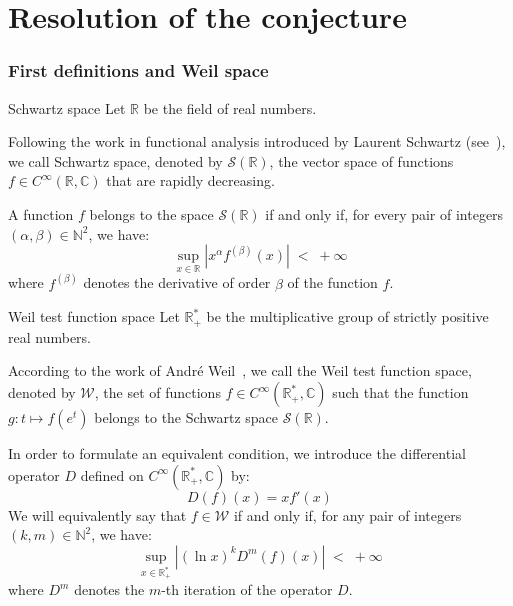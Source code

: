 \documentclass[Riemann_Hypothesis.tex]{subfiles}
\begin{document}
\pagebreak
\color{red}
\part{Resolution of the conjecture}
\color{black}

\color{red}
\section{First definitions and Weil space}
\color{black}

\begin{DefNefEn}[label=df:EspaceSchwartz]{Schwartz space}
    Let $\mathbb{R}$ be the field of real numbers. \par
    Following the work in functional analysis introduced by Laurent Schwartz 
    (see~\cite{schwartz1966_distributions_en}), we call Schwartz space, denoted by $\mathcal{S}(\mathbb{R})$, the vector space of functions $f \in C^\infty(\mathbb{R}, \mathbb{C})$ that are rapidly decreasing. \par
    A function $f$ belongs to the space $\mathcal{S}(\mathbb{R})$ if and only if, for every pair of integers $(\alpha, \beta) \in \mathbb{N}^2$, we have:
    \begin{equation*}
        \sup_{x \in \mathbb{R}} \left| x^\alpha f^{(\beta)}(x) \right| \;<\; +\infty
    \end{equation*}
    where $f^{(\beta)}$ denotes the derivative of order $\beta$ of the function $f$.
\end{DefNefEn}


\begin{DefNefEn}[label=df:EspaceWeil_fr]{Weil test function space}
    Let $\mathbb{R}_+^*$ be the multiplicative group of strictly positive real numbers. \par
    According to the work of André Weil~\cite{weil1952_formules_en}, 
    we call the Weil test function space, denoted by $\mathcal{W}$, the set of functions $f \in C^\infty(\mathbb{R}_+^*, \mathbb{C})$ such that the function $g : t \mapsto f(e^t)$ belongs to the Schwartz space $\mathcal{S}(\mathbb{R})$. \par
    In order to formulate an equivalent condition, we introduce the differential operator $D$ defined on $C^\infty(\mathbb{R}_+^*, \mathbb{C})$ by:
    \begin{equation*}
        D(f)(x) = x f'(x)
    \end{equation*}
    We will equivalently say that $f \in \mathcal{W}$ if and only if, for any pair of integers $(k, m) \in \mathbb{N}^2$, we have:
    \begin{equation*}
        \sup_{x \in \mathbb{R}_+^*} \left| (\ln x)^k D^m(f)(x) \right| \;<\; +\infty
    \end{equation*}
    where $D^m$ denotes the $m$-th iteration of the operator $D$.
\end{DefNefEn}
\end{document}
